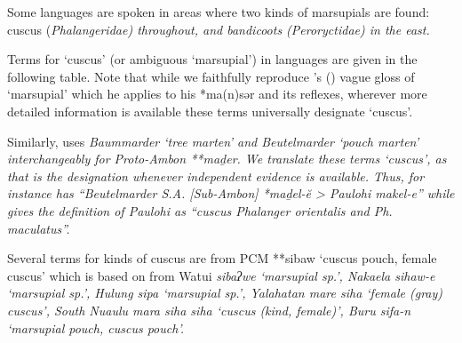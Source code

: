 Some  languages are spoken in areas where two
kinds of marsupials are found: cuscus (\it{Phalangeridae}) throughout,
and bandicoots (\it{Peroryctidae}) in the east.

Terms for ‘cuscus’ (or ambiguous ‘marsupial’) in 
languages are given in the following table.
Note that while we faithfully reproduce
\citeauthor{Collins1983}'s (\citeyear{Collins1983})
vague gloss of `marsupial' which he applies to his *ma(n)sər and its reflexes,
wherever more detailed information is
available these terms universally designate `cuscus'.

Similarly, \citet{Stresemann1927} uses
\it{Baummarder} `tree marten' and \it{Beutelmarder} `pouch marten'
interchangeably for Proto-Ambon **maḏer.
We translate these terms `cuscus', as that is the designation
whenever independent evidence is available.
Thus, for instance \citet[41]{Stresemann1927} has
``Beutelmarder S.A. [Sub-Ambon] *maḏel-ĕ > Paulohi \it{makel-e}''
while \citet[130]{Stresemann1918} gives the definition of Paulohi
as ``cuscus \it{Phalanger orientalis} and \it{Ph. maculatus}''.

Several terms for kinds of cuscus are from PCM **sibaw
‘cuscus pouch, female cuscus’ which is based on from Watui \it{sibaʔwe} ‘marsupial sp.’,
Naka{\Q}ela \it{sihaw-e} ‘marsupial sp.’,
Hulung \it{sipa} ‘marsupial sp.’,
Yalahatan \it{mare siha} ‘female (gray) cuscus’,
South Nuaulu \it{mara siha {\tl} siha} ‘cuscus (kind,
female)’, Buru \it{sifa-n} ‘marsupial pouch,
cuscus pouch’.

